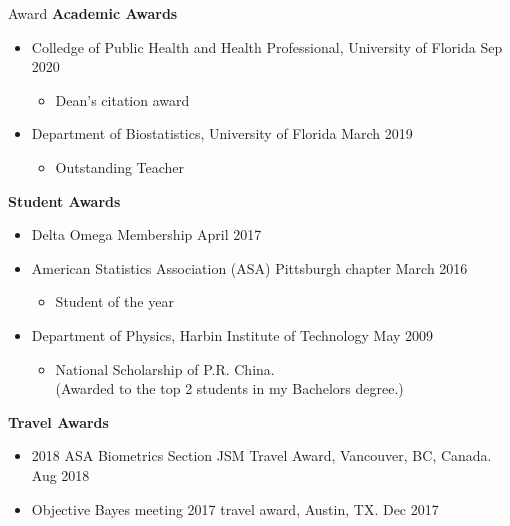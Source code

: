 \documentclass{resume} %
\begin{document}
\begin{rSection}{Award}
\textbf{Academic Awards}
\begin{itemize}[noitemsep,topsep=0pt]

\item  Colledge of Public Health and Health Professional, University of Florida \hfill Sep 2020
\begin{itemize}[noitemsep,topsep=0pt]
\item Dean's citation award
\end{itemize}

\item  Department of Biostatistics, University of Florida \hfill March 2019
\begin{itemize}[noitemsep,topsep=0pt]
\item Outstanding Teacher
\end{itemize}
\end{itemize}


\textbf{Student Awards}
\begin{itemize}[noitemsep,topsep=0pt]
\item  Delta Omega Membership \hfill April 2017
\item American Statistics Association (ASA) Pittsburgh chapter  \hfill March 2016
\begin{itemize}[noitemsep,topsep=0pt]
\item Student of the year
\end{itemize}
\item Department of Physics, Harbin Institute of Technology \hfill May 2009
\begin{itemize}[noitemsep,topsep=0pt]
\item National Scholarship of P.R. China. \\(Awarded to the top 2 students in my Bachelors degree.)
\end{itemize}
\end{itemize}


\textbf{Travel Awards} 

\begin{itemize}[noitemsep,topsep=0pt]
\item 2018 ASA Biometrics Section JSM Travel Award, Vancouver, BC, Canada. \hfill Aug 2018
\end{itemize}

\begin{itemize}[noitemsep,topsep=0pt]
\item Objective Bayes meeting 2017 travel award, Austin, TX. \hfill Dec 2017
\end{itemize}


\end{rSection}
\end{document}
